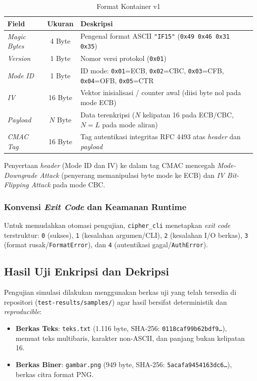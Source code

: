 \begin{table}[H]
  \centering
  \caption{Format Kontainer v1}\label{tab:container_layout}
  \begin{tabular}{lcp{9.5cm}}
    \toprule
    Field & Ukuran & Deskripsi \\
    \midrule
    \textit{Magic Bytes} & 4 Byte & Pengenal format ASCII \texttt{"IF15"} (\texttt{0x49 0x46 0x31 0x35}) \\
    \textit{Version}     & 1 Byte & Nomor versi protokol (\texttt{0x01}) \\
    \textit{Mode ID}     & 1 Byte & ID mode: \texttt{0x01}=ECB, \texttt{0x02}=CBC, \texttt{0x03}=CFB, \texttt{0x04}=OFB, \texttt{0x05}=CTR \\
    \textit{IV}          & 16 Byte & Vektor inisialisasi / counter awal (diisi byte nol pada mode ECB) \\
    \textit{Payload}     & $N$ Byte & Data terenkripsi ($N$ kelipatan 16 pada ECB/CBC, $N = L$ pada mode aliran) \\
    \textit{CMAC Tag}    & 16 Byte & Tag autentikasi integritas RFC 4493 atas \textit{header} dan \textit{payload} \\
    \bottomrule
  \end{tabular}
\end{table}

Penyertaan \textit{header} (Mode ID dan IV) ke dalam tag CMAC mencegah \textit{Mode-Downgrade Attack} (penyerang memanipulasi byte mode ke ECB) dan \textit{IV Bit-Flipping Attack} pada mode CBC.

\subsubsection{Konvensi \textit{Exit Code} dan Keamanan Runtime}
Untuk memudahkan otomasi pengujian, \texttt{cipher\_cli} menetapkan \textit{exit code} terstruktur: \texttt{0} (sukses), \texttt{1} (kesalahan argumen/CLI), \texttt{2} (kesalahan I/O berkas), \texttt{3} (format rusak/\texttt{FormatError}), dan \texttt{4} (autentikasi gagal/\texttt{AuthError}).

\subsection{Hasil Uji Enkripsi dan Dekripsi}
Pengujian simulasi dilakukan menggunakan berkas uji yang telah tersedia di repositori (\texttt{test-results/samples/}) agar hasil bersifat deterministik dan \textit{reproducible}:
\begin{itemize}
  \item \textbf{Berkas Teks}: \texttt{teks.txt} (1.116 byte, SHA-256: \texttt{0118caf99b62bdf9\dots{}}), memuat teks multibaris, karakter non-ASCII, dan panjang bukan kelipatan 16.
  \item \textbf{Berkas Biner}: \texttt{gambar.png} (949 byte, SHA-256: \texttt{5acafa9454163dc6\dots{}}), berkas citra format PNG.
\end{itemize}

